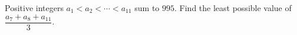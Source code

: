 Positive integers $a_1<a_2<\cdots<a_{11}$ sum to $995$. Find the least possible value of $\dfrac{a_7+a_8+a_{11}}{3}$.
